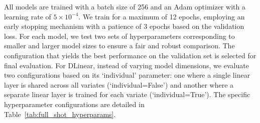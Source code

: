 All models are trained with a batch size of 256 and an Adam optimizer with a learning rate of $5 \times 10^{-4}$. We train for a maximum of 12 epochs, employing an early stopping mechanism with a patience of 3 epochs based on the validation loss. For each model, we test two sets of hyperparameters corresponding to smaller and larger model sizes to ensure a fair and robust comparison. The configuration that yields the best performance on the validation set is selected for final evaluation. For DLinear, instead of varying model dimensions, we evaluate two configurations based on its `individual' parameter: one where a single linear layer is shared across all variates (`individual=False') and another where a separate linear layer is trained for each variate (`individual=True'). The specific hyperparameter configurations are detailed in Table~\ref{tab:full_shot_hyperparams}.

\begin{table}[ht]
\centering

\caption{Hyperparameter configurations for the baseline models. Values for the two evaluated sets are separated by a slash (/). We detail the number of layers, model dimension ($\mathbf{d}_{\text{model}}$), feed-forward dimension ($\mathbf{d}_{\text{ff}}$), and the number of attention heads.}
\label{tab:full_shot_hyperparams}
\end{table}


